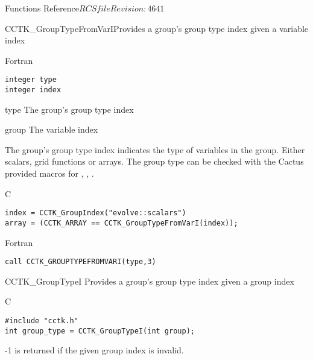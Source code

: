 \begin{cactuspart}{ Functions Reference}{$RCSfile$}{$Revision: 4641 $}
\begin{FunctionDescription}{CCTK\_GroupTypeFromVarI}{Provides a group's group type
               index given a variable index}
\begin{SynopsisSection}
\begin{Synopsis}{Fortran}
\begin{verbatim}
integer type
integer index\end{verbatim}
\end{Synopsis}
\end{SynopsisSection}
\begin{ParameterSection}
\begin{Parameter}{type}
The group's group type index
\end{Parameter}
\begin{Parameter}{group}
The variable index
\end{Parameter}
\end{ParameterSection}
\begin{Discussion}
  The group's group type index indicates the type of variables in the
  group.  Either scalars, grid functions or arrays.  The group type
  can be checked with the Cactus provided macros for
  , , .
\end{Discussion}
\begin{ExampleSection}
\begin{Example}{C}
\begin{verbatim}
index = CCTK_GroupIndex("evolve::scalars")
array = (CCTK_ARRAY == CCTK_GroupTypeFromVarI(index));
\end{verbatim}
\end{Example}
\begin{Example}{Fortran}
\begin{verbatim}
call CCTK_GROUPTYPEFROMVARI(type,3)
\end{verbatim}
\end{Example}
\end{ExampleSection}
\end{FunctionDescription}

\begin{FunctionDescription}{CCTK\_GroupTypeI}{}
\label{CCTK-GroupTypeI}
Provides a group's group type index given a group index
\begin{SynopsisSection}
\begin{Synopsis}{C}
\begin{verbatim}
#include "cctk.h"
int group_type = CCTK_GroupTypeI(int group);
\end{verbatim}
\end{Synopsis}
\end{SynopsisSection}

\begin{ResultSection}
\begin{Result}{-1}
-1 is returned if the given group index is invalid.
\end{Result}
\end{ResultSection}


\end{FunctionDescription}
\end{cactuspart}
